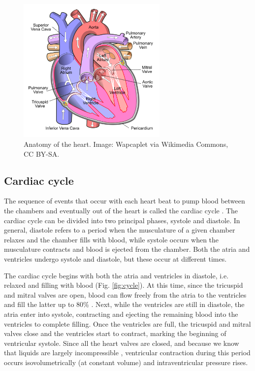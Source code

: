 \documentclass[12pt]{article}
\begin{document}
\begin{figure}[h!]
\centering
\includegraphics[width=0.65\textwidth]{figures/heart.png}
\caption{Anatomy of the heart. Image: Wapcaplet via Wikimedia Commons, CC BY-SA.}
\label{fig:heart}
\end{figure}

\subsection*{Cardiac cycle}

The sequence of events that occur with each heart beat to pump blood between the chambers and eventually out of the heart is called the cardiac cycle \cite{openStaxCycle,guyton2016book}. The cardiac cycle can be divided into two principal phases, systole and diastole. In general, diastole refers to a period when the musculature of a given chamber relaxes and the chamber fills with blood, while systole occurs when the musculature contracts and blood is ejected from the chamber. Both the atria and ventricles undergo systole and diastole, but these occur at different times. 

The cardiac cycle begins with both the atria and ventricles in diastole, i.e. relaxed and filling with blood (Fig. \ref{fig:cycle}). At this time, since the tricuspid and mitral valves are open, blood can flow freely from the atria to the ventricles and fill the latter up to 80\% \cite{guyton2016book,openStaxCycle}. Next, while the ventricles are still in diastole, the atria enter into systole, contracting and ejecting the remaining blood into the ventricles to complete filling. Once the ventricles are full, the tricuspid and mitral valves close and the ventricles start to contract, marking the beginning of ventricular systole. Since all the heart valves are closed, and because we know that liquids are largely incompressible \cite{mccall2010physics}, ventricular contraction during this period occurs isovolumetrically (at constant volume) and intraventricular pressure rises. 
\end{document}

